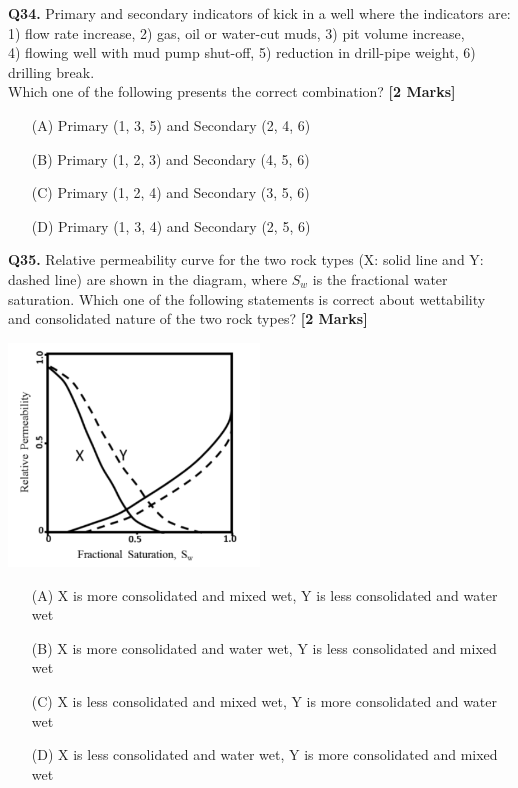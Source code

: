 \documentclass[11pt]{article}
\newcommand{\questionb}[2]{
    \noindent\textbf{Q#2.} #1 \hfill \textbf{[2 Marks]}
}
\begin{document}
\questionb{Primary and secondary indicators of kick in a well where the indicators are: \\
1) flow rate increase, 2) gas, oil or water-cut muds, 3) pit volume increase, \\
4) flowing well with mud pump shut-off, 5) reduction in drill-pipe weight, 6) drilling break. \\
Which one of the following presents the correct combination?}{34}
\begin{enumerate}
    \item[(A)] Primary (1, 3, 5) and Secondary (2, 4, 6)  
    \item[(B)] Primary (1, 2, 3) and Secondary (4, 5, 6)  
    \item[(C)] Primary (1, 2, 4) and Secondary (3, 5, 6)  
    \item[(D)] Primary (1, 3, 4) and Secondary (2, 5, 6)  
\end{enumerate}
\vspace{0.5cm}

\questionb{Relative permeability curve for the two rock types (X: solid line and Y: dashed line) are shown in the diagram, where \( S_w \) is the fractional water saturation. Which one of the following statements is correct about wettability and consolidated nature of the two rock types?}{35}
\begin{center}
\includegraphics[width=0.5\textwidth]{figures/35.png}
\end{center}
\begin{enumerate}
    \item[(A)] X is more consolidated and mixed wet, Y is less consolidated and water wet  
    \item[(B)] X is more consolidated and water wet, Y is less consolidated and mixed wet  
    \item[(C)] X is less consolidated and mixed wet, Y is more consolidated and water wet  
    \item[(D)] X is less consolidated and water wet, Y is more consolidated and mixed wet  
\end{enumerate}
\vspace{0.5cm}
\end{document}
